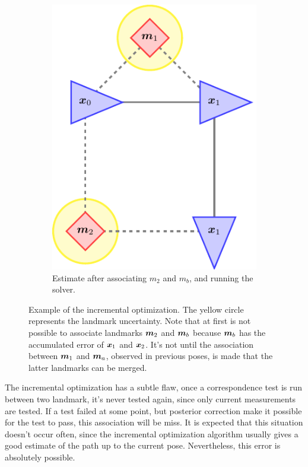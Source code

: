 \begin{figure}[htbp!]
\begin{subfigure}[htbp!]{0.25\textwidth}
        \includegraphics[width=\textwidth]{tikz/incremental3.pdf}
        \caption{Estimate after associating $m_2$ and $m_b$, and running the solver.}
    \end{subfigure}
    \caption[Example of the incremental optimization.]{Example of the incremental optimization. The yellow circle represents the landmark uncertainty. Note that at first is not possible to associate landmarks $\boldsymbol{m}_2$ and $\boldsymbol{m}_b$ because $\boldsymbol{m}_b$ has the accumulated error of $\boldsymbol{x}_1$ and $\boldsymbol{x}_2$. It's not until the association between $\boldsymbol{m}_1$ and $\boldsymbol{m}_a$, observed in previous poses, is made that the latter landmarks can be merged.}
    \label{fig:incremental}
\end{figure}    
The incremental optimization has a subtle flaw, once a correspondence test is run between two landmark, it's never tested again, since only current measurements are tested. If a test failed at some point, but posterior correction make it possible for the test to pass, this association will be miss. It is expected that this situation doesn't occur often, since the incremental optimization algorithm usually gives a good estimate of the path up to the current pose. Nevertheless, this error is absolutely possible.


